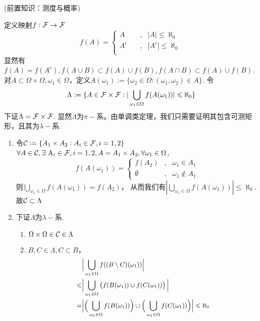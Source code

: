 \documentclass[UTF8, a4paper, 12pt, oneside, twocolumn]{article}
\numberwithin{equation}{section}
\numberwithin{figure}{section}
\numberwithin{table}{section}
\def\A{~\mathrm{A}}
\def\dbigcup{\displaystyle\bigcup}	%
\newif\ifproof
\newenvironment{Ex}[1][]{\prooffalse \begin{EExercise}{#1}{}}%
{\ifproof%
\hfill\ensuremath{\square}\end{Proof}%
\fi%
\end{EExercise}}
\begin{document}
\begin{Ex}[(前置知识：测度与概率)]{}
\begin{enumerate}
\begin{enumerate}
\end{enumerate} 
\end{enumerate}
定义映射$f:\mathcal{F}\to\mathcal{F}$
\begin{equation*}
f(A)=\left\{
	\begin{array}{lcl}
	A \quad &,&|A|\leq\aleph_0\\
	A^c \quad &,&|A^c|\leq\aleph_0\\
	\end{array}
	\right.
\end{equation*}
显然有$f(A)=f(A^c),f(A\cup B)\subset f(A)\cup f(B), f(A\cap B)\subset f(A)\cup f(B)$. 对$A\subset \Omega\times\Omega,\omega_1\in \Omega$，定义$A(\omega_1):=\{\omega_2\in\Omega:(\omega_1,\omega_2)\in A\}$. 令$$\Lambda:=\{A\in\calF\times\calF:|\dbigcup_{\omega_1\in\Omega}f(A(\omega_1))|\leq\aleph_0\}$$
下证$\Lambda=\mathcal{F}\times\mathcal{F}$. 显然$\Lambda$为$\pi-$系。由单调类定理，我们只需要证明其包含可测矩形，且其为$\lambda-$系. 
\begin{enumerate}
\item 令$\mathcal{C} :=\{A_1\times A_2 :A_i\in\mathcal{F},i=1,2\}$
$\forall A\in\calC,\exists\A_i\in\calF,i=1,2,A=A_1\times A_2,\forall \omega_1\in\Omega$, 
\begin{equation*}
f(A(\omega_1))=\left\{
	\begin{array}{ccl}
	f(A_2) &,&\omega_1\in A_1\\
	\emptyset&,&\omega_1\notin A_1
\end{array}
	\right.
\end{equation*}
则$\dbigcup_{\omega_1\in\Omega}f(A(\omega_1))=f(A_2)$，
从而我们有$|\dbigcup_{\omega_1\in\Omega}f(A(\omega_1))|\leq\aleph_0$. 故$\mathcal{C}\subset\Lambda$
\item 下证$\Lambda$为$\lambda -$系.
\begin{enumerate}
\item $\Omega\times\Omega\in\mathcal{C}\in\Lambda$
\item $B,C\in\Lambda,C\subset B$，
\begin{equation*}
\begin{small}
\begin{aligned}
&\Big|\dbigcup_{\omega_1\in\Omega}f((B\minus C)(\omega_1))\Big|\\
\leq&\Big|\dbigcup_{\omega_1\in\Omega}\left(f(B(\omega_1))\cup f(C(\omega_1))\right)\Big|\\
=&\Big|\Big(\dbigcup_{\omega_1\in\Omega}f(B(\omega_1))\Big)\cup\Big(\dbigcup_{\omega_1\in\Omega}f(C(\omega_1))\Big)\Big|\leq\aleph_0\\
\end{aligned}

\end{small}
\end{equation*}
\end{enumerate}
\end{enumerate}
\end{Ex}
\end{document}
